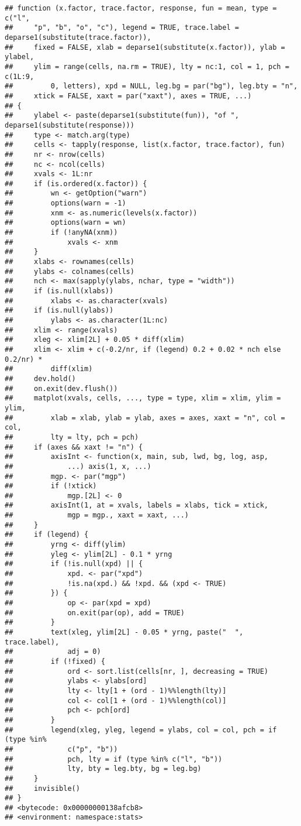 \documentclass[
]{article}
\begin{document}
\begin{verbatim}
## function (x.factor, trace.factor, response, fun = mean, type = c("l", 
##     "p", "b", "o", "c"), legend = TRUE, trace.label = deparse1(substitute(trace.factor)), 
##     fixed = FALSE, xlab = deparse1(substitute(x.factor)), ylab = ylabel, 
##     ylim = range(cells, na.rm = TRUE), lty = nc:1, col = 1, pch = c(1L:9, 
##         0, letters), xpd = NULL, leg.bg = par("bg"), leg.bty = "n", 
##     xtick = FALSE, xaxt = par("xaxt"), axes = TRUE, ...) 
## {
##     ylabel <- paste(deparse1(substitute(fun)), "of ", deparse1(substitute(response)))
##     type <- match.arg(type)
##     cells <- tapply(response, list(x.factor, trace.factor), fun)
##     nr <- nrow(cells)
##     nc <- ncol(cells)
##     xvals <- 1L:nr
##     if (is.ordered(x.factor)) {
##         wn <- getOption("warn")
##         options(warn = -1)
##         xnm <- as.numeric(levels(x.factor))
##         options(warn = wn)
##         if (!anyNA(xnm)) 
##             xvals <- xnm
##     }
##     xlabs <- rownames(cells)
##     ylabs <- colnames(cells)
##     nch <- max(sapply(ylabs, nchar, type = "width"))
##     if (is.null(xlabs)) 
##         xlabs <- as.character(xvals)
##     if (is.null(ylabs)) 
##         ylabs <- as.character(1L:nc)
##     xlim <- range(xvals)
##     xleg <- xlim[2L] + 0.05 * diff(xlim)
##     xlim <- xlim + c(-0.2/nr, if (legend) 0.2 + 0.02 * nch else 0.2/nr) * 
##         diff(xlim)
##     dev.hold()
##     on.exit(dev.flush())
##     matplot(xvals, cells, ..., type = type, xlim = xlim, ylim = ylim, 
##         xlab = xlab, ylab = ylab, axes = axes, xaxt = "n", col = col, 
##         lty = lty, pch = pch)
##     if (axes && xaxt != "n") {
##         axisInt <- function(x, main, sub, lwd, bg, log, asp, 
##             ...) axis(1, x, ...)
##         mgp. <- par("mgp")
##         if (!xtick) 
##             mgp.[2L] <- 0
##         axisInt(1, at = xvals, labels = xlabs, tick = xtick, 
##             mgp = mgp., xaxt = xaxt, ...)
##     }
##     if (legend) {
##         yrng <- diff(ylim)
##         yleg <- ylim[2L] - 0.1 * yrng
##         if (!is.null(xpd) || {
##             xpd. <- par("xpd")
##             !is.na(xpd.) && !xpd. && (xpd <- TRUE)
##         }) {
##             op <- par(xpd = xpd)
##             on.exit(par(op), add = TRUE)
##         }
##         text(xleg, ylim[2L] - 0.05 * yrng, paste("  ", trace.label), 
##             adj = 0)
##         if (!fixed) {
##             ord <- sort.list(cells[nr, ], decreasing = TRUE)
##             ylabs <- ylabs[ord]
##             lty <- lty[1 + (ord - 1)%%length(lty)]
##             col <- col[1 + (ord - 1)%%length(col)]
##             pch <- pch[ord]
##         }
##         legend(xleg, yleg, legend = ylabs, col = col, pch = if (type %in% 
##             c("p", "b")) 
##             pch, lty = if (type %in% c("l", "b")) 
##             lty, bty = leg.bty, bg = leg.bg)
##     }
##     invisible()
## }
## <bytecode: 0x00000000138afcb8>
## <environment: namespace:stats>
\end{verbatim}
\end{document}
